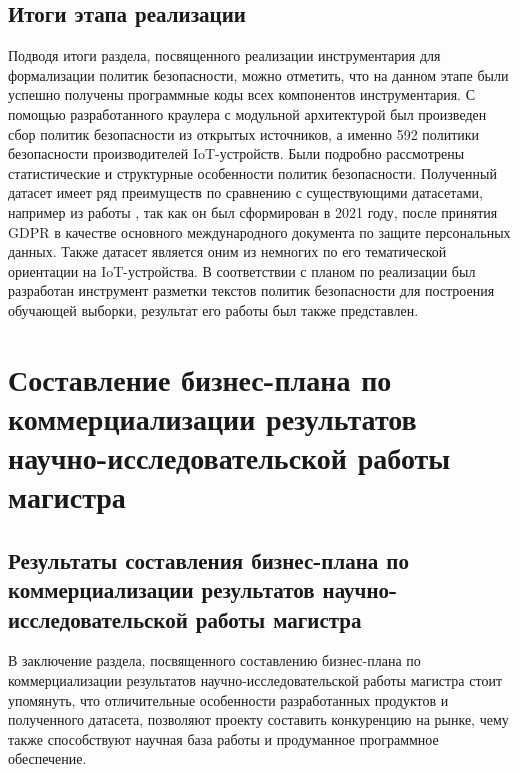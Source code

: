 \documentclass[../main]{subfiles}
\begin{document}
\subsection{Итоги этапа реализации}
Подводя итоги раздела, посвященного реализации инструментария для формализации политик безопасности, можно отметить, что на данном этапе были успешно получены программные коды всех компонентов инструментария. С помощью разработанного краулера с модульной архитектурой был произведен сбор политик безопасности из открытых источников, а именно 592 политики безопасности производителей IoT-устройств. Были подробно рассмотрены статистические и структурные особенности политик безопасности. Полученный датасет имеет ряд преимуществ по сравнению с существующими датасетами, например из работы \cite{MDPI18}, так как он был сформирован в 2021 году, после принятия GDPR в качестве основного международного документа по защите персональных данных. Также датасет является оним из немногих по его тематической ориентации на IoT-устройства. В соответствии с планом по реализации был разработан инструмент разметки текстов политик безопасности для построения обучающей выборки, результат его работы был также представлен.

\newpage
\section{Составление бизнес-плана по коммерциализации результатов научно-исследовательской работы магистра}


\subsection{Результаты составления бизнес-плана по коммерциализации результатов научно-исследовательской работы магистра}
В заключение раздела, посвященного составлению бизнес-плана по коммерциализации результатов научно-исследовательской работы магистра стоит упомянуть, что отличительные особенности разработанных продуктов и полученного датасета, позволяют проекту составить конкуренцию на рынке, чему также способствуют научная база работы и продуманное программное обеспечение.
\end{document}
